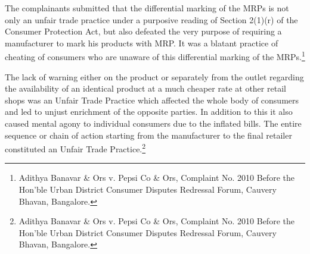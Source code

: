 \begin{multicols}{2}
\vspace{-.15cm}

\noi
The complainants submitted that the differential marking of the MRPs is not only an unfair
trade practice under a purposive reading of Section 2(1)(r) of the Consumer Protection Act, but
also defeated the very purpose of requiring a manufacturer to mark his products with MRP. It
was a blatant practice of cheating of consumers who are unaware of this differential marking
of the MRPs.\footnote{Adithya Banavar \& Ors v. Pepsi Co \& Ors, Complaint No. 2010 Before the Hon’ble Urban District Consumer Disputes Redressal Forum, Cauvery Bhavan, Bangalore.}

\vspace{-.15cm}

\noi
The lack of warning either on the product or separately from the outlet regarding the availability
of an identical product at a much cheaper rate at other retail shops was an Unfair Trade Practice
which affected the whole body of consumers and led to unjust enrichment of the opposite
parties. In addition to this it also caused mental agony to individual consumers due to the
inflated bills. The entire sequence or chain of action starting from the manufacturer to the final
retailer constituted an Unfair Trade Practice.\footnote{Adithya Banavar \& Ors v. Pepsi Co \& Ors, Complaint No. 2010 Before the Hon’ble Urban District Consumer Disputes Redressal Forum, Cauvery Bhavan, Bangalore.}

\vspace{-.15cm}


\end{multicols}
